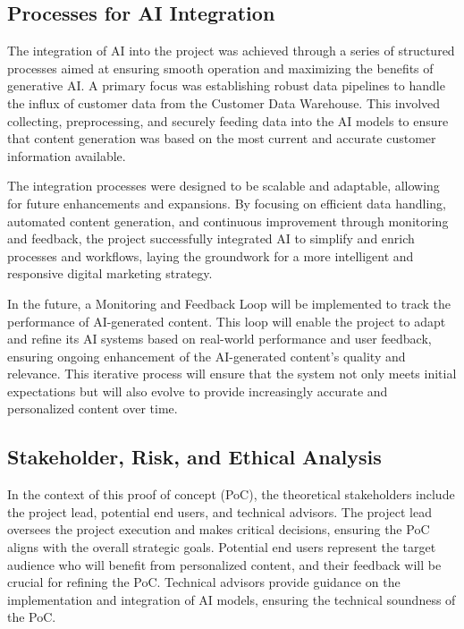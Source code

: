 \documentclass[%
pdftex,
oneside,			%
11pt,				%
parskip=half,		%
headheight = 12pt,	%
headsepline,		%
footsepline,		%
footheight = 16pt,	%
abstracton,		%
DIV=calc,		%
BCOR=8mm,		%
headinclude=false,	%
footinclude=false,	%
listof=totoc,		%
toc=bibliography,	%
]{scrreprt}	%
\begin{document}
        \subsection{Processes for AI Integration}

            The integration of AI into the project was achieved through a series of structured processes aimed at ensuring smooth operation and maximizing the benefits of generative AI.
            A primary focus was establishing robust data pipelines to handle the influx of customer data from the Customer Data Warehouse.
            This involved collecting, preprocessing, and securely feeding data into the AI models to ensure that content generation was based on the most current and accurate customer information available.

            The integration processes were designed to be scalable and adaptable, allowing for future enhancements and expansions. 
            By focusing on efficient data handling, automated content generation, and continuous improvement through monitoring and feedback, the project successfully integrated AI to simplify and enrich processes and workflows, laying the groundwork for a more intelligent and responsive digital marketing strategy.

            In the future, a Monitoring and Feedback Loop will be implemented to track the performance of AI-generated content. 
            This loop will enable the project to adapt and refine its AI systems based on real-world performance and user feedback, ensuring ongoing enhancement of the AI-generated content's quality and relevance.
            This iterative process will ensure that the system not only meets initial expectations but will also evolve to provide increasingly accurate and personalized content over time.

        \subsection{Stakeholder, Risk, and Ethical Analysis}

            In the context of this proof of concept (PoC), the theoretical stakeholders include the project lead, potential end users, and technical advisors. 
            The project lead oversees the project execution and makes critical decisions, ensuring the PoC aligns with the overall strategic goals. 
            Potential end users represent the target audience who will benefit from personalized content, and their feedback will be crucial for refining the PoC. 
            Technical advisors provide guidance on the implementation and integration of AI models, ensuring the technical soundness of the PoC.
\end{document}
